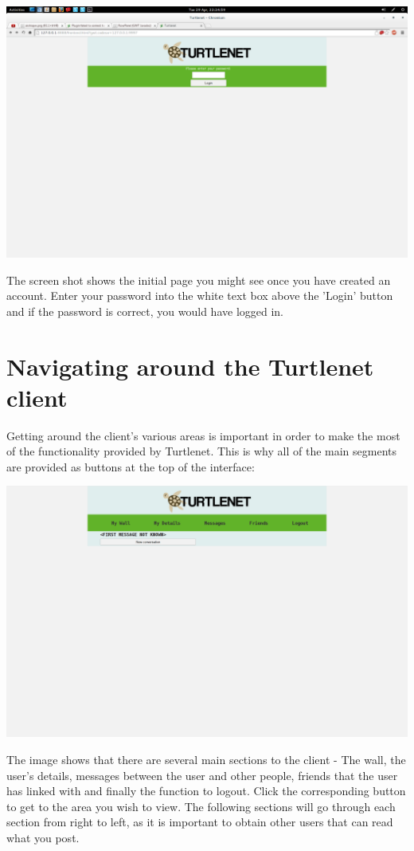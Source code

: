 \includegraphics[scale=0.2]{../Screenshots/Screenshot from 2014-04-29 22-24-59}

The screen shot shows the initial page you might see once you have created an
account.  Enter your password into the white text box above the 'Login' button
and if the password is correct, you would have logged in.

\pagebreak
\section{Navigating around the Turtlenet client}
Getting around the client's various areas is important in order to make the most
of the functionality provided by Turtlenet.  This is why all of the main
segments are provided as buttons at the top of the interface:

\includegraphics[scale=0.2]{../Screenshots/Screenshot from 2014-04-29 22-31-38}

The image shows that there are several main sections to the client - The wall,
the user's details, messages between the user and other people, friends that the
user has linked with and finally the function to logout.  Click the
corresponding button to get to the area you wish to view.  The following
sections will go through each section from right to left, as it is important to
obtain other users that can read what you post.

